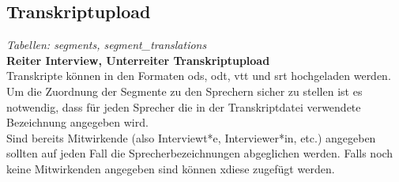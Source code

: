 \documentclass[a4paper,10pt]{article}
\begin{document}
\subsection{Transkriptupload}
\textit{Tabellen: segments, segment\_translations}\\

\textbf{Reiter Interview, Unterreiter Transkriptupload}\\

Transkripte  können in den Formaten ods, odt, vtt und srt hochgeladen  werden.\\
Um die Zuordnung der Segmente zu den Sprechern sicher zu stellen ist es notwendig, dass für jeden Sprecher die in der Transkriptdatei verwendete Bezeichnung angegeben wird.\\
Sind bereits Mitwirkende (also Interviewt*e, Interviewer*in, etc.) angegeben sollten auf jeden Fall die  Sprecherbezeichnungen abgeglichen werden. Falls noch keine Mitwirkenden angegeben sind können xdiese zugefügt werden. 
\end{document}
